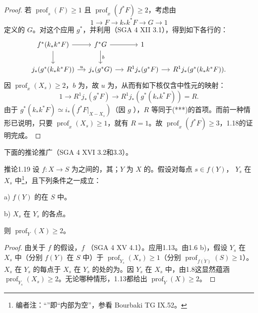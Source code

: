 \begin{proof}
若 $\operatorname{prof}_s(F)\geq1$ 且 $\operatorname{prof}_x(f^*F)\geq2$，考虑由
\[1\longrightarrow F\longrightarrow k_*k^*F\longrightarrow G\longrightarrow1\]
定义的 $G$。对这个应用 $g^*$，并利用（SGA 4 XII 3.1），得到如下各行的：
\[\begin{tikzcd}[column sep=small]
f^*(k_*k^*F)\arrow[r]\arrow[d]&f^*G\arrow[r]\arrow[d,"b"]&1&{}\\
j_*(g^*(k_*k^*F))\arrow[r,"u"]&j_*(g^*G)\arrow[r]&R^1j_*(g^*F)\arrow[r]&R^1j_*(g^*(k_*k^*F)).
\end{tikzcd}\]
因 $\operatorname{prof}_x(X_s)\geq2$，$b$ 为，故 $u$ 为，从而有如下核仅含中性元的映射：
\[1\longrightarrow R^1j_*(g^*F)\longrightarrow R^1j_*(g^*(k_*k^*F))=R.\]
由于 $g^*(k_*k^*F)\simeq i_*(f^*F|_{X-X_s})$（因 $g$ ），$R$ 等同于(***)的首项。而前一种情形已说明，只要 $\operatorname{prof}_x(X_s)\geq1$，就有 $R=1$。故 $\operatorname{prof}_x(f^*F)\geq3$，1.18的证明完成。
\end{proof}
下面的推论推广（SGA 4 XVI 3.2和3.3）。
\begin{SGAresult}{推论}{1.19}
设 $f:X\to S$ 为之间的，其；$Y$ 为 $X$ 的。假设对每点 $s\in f(Y)$， $Y_s$ 在 $X_s$ 中\footnote{编者注：“”即“内部为空”，参看 Bourbaki TG IX.52。}，且下列条件之一成立：

a) $f(Y)$ 的在 $S$ 中。

b) $X_s$ 在 $Y_s$ 的各点。

则 $\operatorname{prof}_Y(X)\geq2$。
\end{SGAresult}
\begin{proof}
由关于 $f$ 的假设，$f$ （SGA 4 XV 4.1）。应用1.13。由1.6 b)，假设 $Y_s$ 在 $X_s$ 中（分别 $f(Y)$ 在 $S$ 中）于 $\operatorname{prof}_{Y_s}(X_s)\geq1$（分别 $\operatorname{prof}_{\overline{f(Y)}}(S)\geq1$）。$X_s$ 在 $Y_s$ 的每点于 $X_s$ 在 $Y_s$ 的处的为。因 $Y_s$ 在 $X_s$ 中，由1.8这显然蕴涵 $\operatorname{prof}_{Y_s}(X_s)\geq2$。无论哪种情形，1.13都给出 $\operatorname{prof}_Y(X)\geq2$。
\end{proof}
